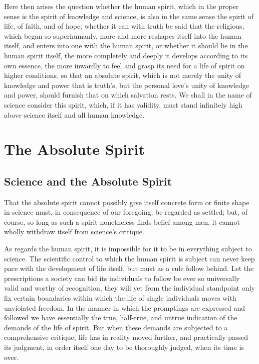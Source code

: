 \documentclass[12pt]{book}
\begin{document}
Here then arises the question whether the human spirit, which in the proper sense is the spirit of
knowledge and science, is also in the same sense the spirit of life, of faith, and of hope; whether
it can with truth be said that the religious, which began so superhumanly, more and more reshapes
itself into the human itself, and enters into one with the human spirit, or whether it should lie
in the human spirit itself, the more completely and deeply it develops according to its own essence,
the more inwardly to feel and grasp its need for a life of spirit on higher conditions, so that an
absolute spirit, which is not merely the unity of knowledge and power that is truth's, but the
personal love's unity of knowledge and power, should furnish that on which salvation rests. We
shall in the name of science consider this spirit, which, if it has validity, must stand infinitely
high above science itself and all human knowledge.

\chapter{The Absolute Spirit}

\section{Science and the Absolute Spirit}
\label{sec:25en}

\noindent That the absolute spirit cannot possibly give itself concrete form or finite shape in
science must, in consequence of our foregoing, be regarded as settled; but, of course, so long as
such a spirit nonetheless finds belief among men, it cannot wholly withdraw itself from science's
critique.

As regards the human spirit, it is impossible for it to be in everything subject to science. The
scientific control to which the human spirit is subject can never keep pace with the development of
life itself, but must as a rule follow behind. Let the prescriptions a society can bid its
individuals to follow be ever so universally valid and worthy of recognition, they will yet from
the individual standpoint only fix certain boundaries within which the life of single individuals
moves with unviolated freedom. In the manner in which the promptings are expressed and followed we
have essentially the true, half-true, and untrue indication of the demands of the life of spirit.
But when these demands are subjected to a comprehensive critique, life has in reality moved
further, and practically passed its judgment, in order itself one day to be thoroughly judged, when
its time is over.
\end{document}
